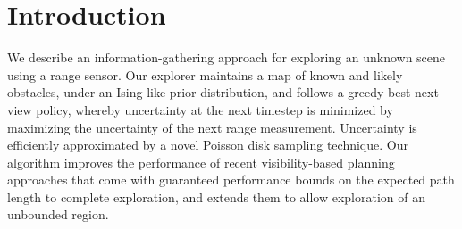 \def\p{\ensuremath{\mathbf{p}}}
\def\v{\ensuremath{\mathbf{v}}}
\def\x{\ensuremath{\mathbf{x}}}
\def\one{\mathbbm{1}}
\def\eps{\varepsilon}

\def\RR{\mathbb{R}}
\def\HH{\mathbb{H}}
\def\PP{\mathbb{P}}
\def\NN{\mathbb{N}}
\def\EE{\mathbb{E}}
\def\II{\mathbb{I}}

\def\A{\mathcal{A}}
\def\Y{\mathcal{Y}}
\def\O{\mathcal{O}}
\def\U{\mathcal{U}}
\def\P{\mathcal{P}}
\def\I{\mathcal{I}}
\def\L{\mathcal{L}}
\def\D{\mathcal{D}}
\def\V{\mathcal{V}}
\def\C{\mathcal{C}}
\def\R{\mathcal{R}}
\def\S{\mathcal{S}}
\def\T{\mathcal{T}}


\section{Introduction}
We describe an information-gathering approach for exploring an unknown scene using a range sensor. 
Our explorer maintains a map of known and likely obstacles, under an Ising-like prior distribution, and
follows a greedy best-next-view policy, whereby uncertainty at the next timestep is minimized by maximizing the uncertainty of the next range measurement.
Uncertainty is efficiently approximated by a novel Poisson disk sampling technique.
Our algorithm improves the performance of recent visibility-based planning approaches that come with guaranteed performance bounds on the expected path length to complete exploration, and extends them to 
allow exploration of an unbounded region.
